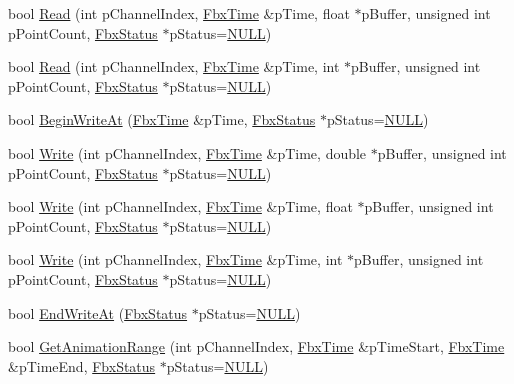 \begin{DoxyCompactItemize}
\item 
bool \hyperlink{class_fbx_cache_a518383cfd39385e077ffc53be85aa728}{Read} (int p\+Channel\+Index, \hyperlink{class_fbx_time}{Fbx\+Time} \&p\+Time, float $\ast$p\+Buffer, unsigned int p\+Point\+Count, \hyperlink{class_fbx_status}{Fbx\+Status} $\ast$p\+Status=\hyperlink{fbxarch_8h_a070d2ce7b6bb7e5c05602aa8c308d0c4}{N\+U\+LL})
\item 
bool \hyperlink{class_fbx_cache_a513dbb2b726eaf353528c8c6900ec77b}{Read} (int p\+Channel\+Index, \hyperlink{class_fbx_time}{Fbx\+Time} \&p\+Time, int $\ast$p\+Buffer, unsigned int p\+Point\+Count, \hyperlink{class_fbx_status}{Fbx\+Status} $\ast$p\+Status=\hyperlink{fbxarch_8h_a070d2ce7b6bb7e5c05602aa8c308d0c4}{N\+U\+LL})
\item 
bool \hyperlink{class_fbx_cache_ade715322780a6993e218251092f3c5c8}{Begin\+Write\+At} (\hyperlink{class_fbx_time}{Fbx\+Time} \&p\+Time, \hyperlink{class_fbx_status}{Fbx\+Status} $\ast$p\+Status=\hyperlink{fbxarch_8h_a070d2ce7b6bb7e5c05602aa8c308d0c4}{N\+U\+LL})
\item 
bool \hyperlink{class_fbx_cache_a9144c3dfd8441a1e73c759259fe1b9d9}{Write} (int p\+Channel\+Index, \hyperlink{class_fbx_time}{Fbx\+Time} \&p\+Time, double $\ast$p\+Buffer, unsigned int p\+Point\+Count, \hyperlink{class_fbx_status}{Fbx\+Status} $\ast$p\+Status=\hyperlink{fbxarch_8h_a070d2ce7b6bb7e5c05602aa8c308d0c4}{N\+U\+LL})
\item 
bool \hyperlink{class_fbx_cache_a6a8522f9c661337e4a458c67bcf1f659}{Write} (int p\+Channel\+Index, \hyperlink{class_fbx_time}{Fbx\+Time} \&p\+Time, float $\ast$p\+Buffer, unsigned int p\+Point\+Count, \hyperlink{class_fbx_status}{Fbx\+Status} $\ast$p\+Status=\hyperlink{fbxarch_8h_a070d2ce7b6bb7e5c05602aa8c308d0c4}{N\+U\+LL})
\item 
bool \hyperlink{class_fbx_cache_a4d1a6dbd1d65fa381ded138b7edbc219}{Write} (int p\+Channel\+Index, \hyperlink{class_fbx_time}{Fbx\+Time} \&p\+Time, int $\ast$p\+Buffer, unsigned int p\+Point\+Count, \hyperlink{class_fbx_status}{Fbx\+Status} $\ast$p\+Status=\hyperlink{fbxarch_8h_a070d2ce7b6bb7e5c05602aa8c308d0c4}{N\+U\+LL})
\item 
bool \hyperlink{class_fbx_cache_a3df95a880da51b2ad2a957f212d76ba6}{End\+Write\+At} (\hyperlink{class_fbx_status}{Fbx\+Status} $\ast$p\+Status=\hyperlink{fbxarch_8h_a070d2ce7b6bb7e5c05602aa8c308d0c4}{N\+U\+LL})
\item 
bool \hyperlink{class_fbx_cache_a974f809c072c4e71c4ff506259474aed}{Get\+Animation\+Range} (int p\+Channel\+Index, \hyperlink{class_fbx_time}{Fbx\+Time} \&p\+Time\+Start, \hyperlink{class_fbx_time}{Fbx\+Time} \&p\+Time\+End, \hyperlink{class_fbx_status}{Fbx\+Status} $\ast$p\+Status=\hyperlink{fbxarch_8h_a070d2ce7b6bb7e5c05602aa8c308d0c4}{N\+U\+LL})

\end{DoxyCompactItemize}
